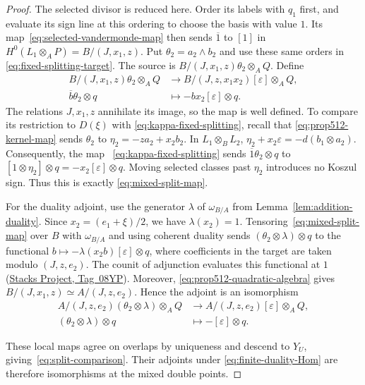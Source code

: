 \documentclass[11pt,letterpaper]{amsart}
\theoremstyle{plain}
\theoremstyle{definition}
\theoremstyle{remark}
\numberwithin{equation}{section}
\newcommand{\StacksTag}[1]{\href{https://stacks.math.columbia.edu/tag/#1}{Stacks Project, Tag~#1}}
\begin{document}
\begin{proof}
The selected divisor is reduced here. Order its labels with $q_1$
first, and evaluate its sign line at this ordering to choose the
basis with value $1$. Its map~\eqref{eq:selected-vandermonde-map}
then sends $\overline1$ to $[1]$ in
$H^0(L_1\otimes_A P)=B/(J,x_1,z)$.
Put $\theta_2=a_2\wedge b_2$ and use these same orders in
\eqref{eq:fixed-splitting-target}. The source is
$B/(J,x_1,z)\theta_2\otimes_A Q$.
Define
\begin{equation}\label{eq:mixed-split-map}
 \begin{aligned}
 B/(J,x_1,z)\theta_2\otimes_A Q
 &\longrightarrow B/(J,z,x_1x_2)[\varepsilon]\otimes_A Q,\\
 \overline b\theta_2\otimes q&\longmapsto-bx_2[\varepsilon]\otimes q.
 \end{aligned}
\end{equation}
The relations $J,x_1,z$ annihilate its image, so the map is well defined.
To  compare its restriction to $D(\xi)$ with \eqref{eq:kappa-fixed-splitting}, recall that
\eqref{eq:prop512-kernel-map} sends $\theta_2$ to
$\eta_2=-za_2+x_2b_2$. In $L_1\otimes_B L_2$,
$
 \eta_2+x_2\varepsilon=-d(b_1\otimes a_2)$.
Consequently, the map ~\eqref{eq:kappa-fixed-splitting}
sends $\overline1\theta_2\otimes q$ to
$[1\otimes\eta_2]\otimes q=-x_2[\varepsilon]\otimes q$.
Moving selected classes  past
$\eta_2$ introduces no Koszul sign. Thus this is exactly
\eqref{eq:mixed-split-map}.

For the duality adjoint, use the generator $\lambda$ of
$\omega_{B/A}$ from Lemma~\ref{lem:addition-duality}.
Since $x_2=(e_1+\xi)/2$, we have $\lambda(x_2)=1$.
Tensoring~\eqref{eq:mixed-split-map} over $B$ with $\omega_{B/A}$
and using coherent duality sends $(\theta_2\otimes\lambda)\otimes q$
to the functional
$
 b\longmapsto-\lambda(x_2b)[\varepsilon]\otimes q$,
where coefficients in the target are taken modulo $(J,z,e_2)$.
The counit of adjunction evaluates this functional at $1$ (\StacksTag{08YP}).
Moreover, \eqref{eq:prop512-quadratic-algebra} gives
$B/(J,x_1,z)\simeq A/(J,z,e_2)$. Hence the adjoint is an isomorphism
\[
 \begin{aligned}
 A/(J,z,e_2)(\theta_2\otimes\lambda)\otimes_A Q
 &\longrightarrow A/(J,z,e_2)[\varepsilon]\otimes_A Q,\\
 (\theta_2\otimes\lambda)\otimes q
 &\longmapsto-[\varepsilon]\otimes q.
 \end{aligned}
\]


These local maps agree on overlaps by uniqueness and descend to
$Y_U$, giving~\eqref{eq:split-comparison}. Their adjoints under
\eqref{eq:finite-duality-Hom} are therefore isomorphisms at the
mixed double points.


\end{proof}
\end{document}
